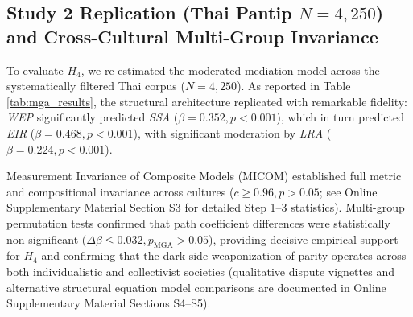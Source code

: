 \subsection{Study 2 Replication (Thai Pantip $N = 4,250$) and Cross-Cultural Multi-Group Invariance}
To evaluate $H_4$, we re-estimated the moderated mediation model across the systematically filtered Thai corpus ($N = 4,250$). As reported in Table \ref{tab:mga_results}, the structural architecture replicated with remarkable fidelity: \textit{WEP} significantly predicted \textit{SSA} ($\beta = 0.352, p < 0.001$), which in turn predicted \textit{EIR} ($\beta = 0.468, p < 0.001$), with significant moderation by \textit{LRA} ($\beta = 0.224, p < 0.001$).

Measurement Invariance of Composite Models (MICOM) established full metric and compositional invariance across cultures ($c \ge 0.96, p > 0.05$; see Online Supplementary Material Section S3 for detailed Step 1--3 statistics). Multi-group permutation tests confirmed that path coefficient differences were statistically non-significant ($\Delta \beta \le 0.032, p_{\text{MGA}} > 0.05$), providing decisive empirical support for $H_4$ and confirming that the dark-side weaponization of parity operates across both individualistic and collectivist societies (qualitative dispute vignettes and alternative structural equation model comparisons are documented in Online Supplementary Material Sections S4--S5).

\begin{table}[htbp]
\centering
\footnotesize
{}
\caption{Cross-Cultural Multi-Group Analysis (MGA) and Invariance Testing (Study 1 vs. Study 2).}
\label{tab:mga_results}
\end{table}

